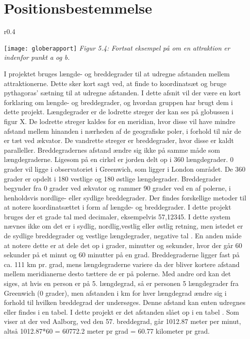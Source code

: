 \section{Positionsbestemmelse}
\begin{wrapfigure}{r}{0.4\textwidth}
	\vspace{-20pt}
	\begin{center}
		\texttt{[image: globerapport]} \newline
		\textit{Figur 5.4: Fortsat eksempel på om en attraktion er indenfor punkt a og b.}\newline
	\end{center}
	\vspace{-30pt}
\end{wrapfigure}
I projektet bruges længde- og breddegrader til at udregne afstanden mellem attraktionerne. Dette sker kort sagt ved, at finde to koordinatsæt og bruge pythagoras’ sætning til at udregne afstanden. I dette afsnit vil der være en kort forklaring om længde- og breddegrader, og hvordan gruppen har brugt dem i dette projekt.\newline
Længdegrader er de lodrette streger der kan ses på globussen i figur X. De lodrette streger kaldes for en meridian, hvor disse vil have mindre afstand mellem hinanden i nærheden af de geografiske poler, i forhold til når de er tæt ved ækvator. De vandrette streger er breddegrader, hvor disse er kaldt paralleller. Breddegradernes afstand ændre sig ikke på samme måde som længdegraderne. \citep{PM} \newline
Ligesom på en cirkel er jorden delt op i 360 længdegrader. 0 grader vil ligge i observatoriet i Greenwich, som ligger i London området. De 360 grader er opdelt i 180 vestlige og 180 østlige længdegrader. Breddegrader begynder fra 0 grader ved ækvator og rammer 90 grader ved en af polerne, i henholdsvis nordlige- eller sydlige breddegrader. \citep{PM}\newline
Der findes forskellige metoder til at notere koordinatsættet i form af længde- og breddegrader. I dette projekt bruges der et grade tal med decimaler, eksempelvis 57,12345. I dette system nævnes ikke om det er i sydlig, nordlig,vestlig eller østlig retning, men istedet er de sydlige breddegrader og vestlige længdegrader, negative tal . En anden måde at notere dette er at dele det op i grader, minutter og sekunder, hvor der går 60 sekunder på et minut og 60 minutter på en grad. Breddegraderne ligger fast på ca. 111 km pr. grad, mens længdegraderne variere da der bliver kortere afstand mellem meridianerne desto tættere de er på polerne. Med andre ord kan det siges, at hvis en person er på 5. længdegrad, så er personen 5 længdegrader fra Greenwich (0 grader), men afstanden i km for hver længdegrad ændre sig i forhold til hvilken breddegrad der undersøges. Denne afstand kan enten udregnes eller findes i en tabel. I dette projekt er det afstanden slået op i en tabel \citep{Earth}. Som viser at der ved Aalborg, ved den 57. breddegrad, går 1012.87 meter per minut, altså 1012.87*60 =  60772.2 meter pr grad = 60.77 kilometer pr grad. \citep{PM}
